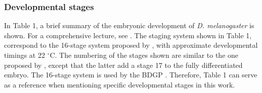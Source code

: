 \subsubsection{Developmental stages}

In Table 1, a brief summary of the embryonic development of \textit{D. melanogaster} is shown. For a comprehensive lecture, see \citep{Campos-Ortega1985,Roberts1998,Gilbert2014}.
%
The staging system shown in Table 1, correspond to the 16-stage system proposed by \citep{Roberts1998}, with approximate developmental timings at 22 $^\circ$C. 
The numbering of the stages shown are similar to the one proposed by \citet{Campos-Ortega1985}, except that the latter add a stage 17 to the fully differentiated embryo.
The 16-stage system is used by the BDGP \citep{Tomancak2002}. Therefore, Table 1 can serve as a reference when mentioning specific developmental stages in this work.

